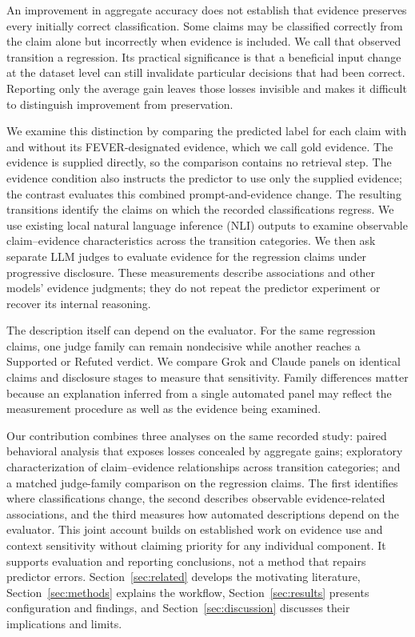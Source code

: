 \documentclass[11pt,letterpaper]{article}
\begin{document}
An improvement in aggregate accuracy does not establish that evidence preserves every initially correct classification. Some claims may be classified correctly from the claim alone but incorrectly when evidence is included. We call that observed transition a regression. Its practical significance is that a beneficial input change at the dataset level can still invalidate particular decisions that had been correct. Reporting only the average gain leaves those losses invisible and makes it difficult to distinguish improvement from preservation.

We examine this distinction by comparing the predicted label for each claim with and without its FEVER-designated evidence, which we call gold evidence. The evidence is supplied directly, so the comparison contains no retrieval step. The evidence condition also instructs the predictor to use only the supplied evidence; the contrast evaluates this combined prompt-and-evidence change. The resulting transitions identify the claims on which the recorded classifications regress. We use existing local natural language inference (NLI) outputs to examine observable claim--evidence characteristics across the transition categories. We then ask separate LLM judges to evaluate evidence for the regression claims under progressive disclosure. These measurements describe associations and other models' evidence judgments; they do not repeat the predictor experiment or recover its internal reasoning.

The description itself can depend on the evaluator. For the same regression claims, one judge family can remain nondecisive while another reaches a Supported or Refuted verdict. We compare Grok and Claude panels on identical claims and disclosure stages to measure that sensitivity. Family differences matter because an explanation inferred from a single automated panel may reflect the measurement procedure as well as the evidence being examined.

Our contribution combines three analyses on the same recorded study: paired behavioral analysis that exposes losses concealed by aggregate gains; exploratory characterization of claim--evidence relationships across transition categories; and a matched judge-family comparison on the regression claims. The first identifies where classifications change, the second describes observable evidence-related associations, and the third measures how automated descriptions depend on the evaluator. This joint account builds on established work on evidence use and context sensitivity without claiming priority for any individual component. It supports evaluation and reporting conclusions, not a method that repairs predictor errors. Section~\ref{sec:related} develops the motivating literature, Section~\ref{sec:methods} explains the workflow, Section~\ref{sec:results} presents configuration and findings, and Section~\ref{sec:discussion} discusses their implications and limits.
\end{document}
